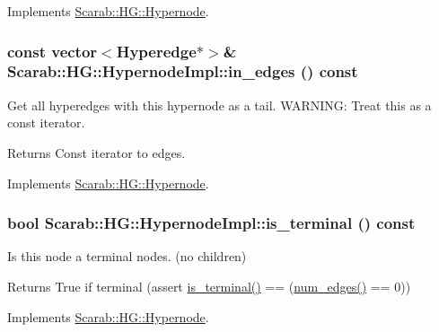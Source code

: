 Implements \hyperlink{classScarab_1_1HG_1_1Hypernode_a533d3e0bc2269ec07edbda32305daf70}{Scarab::HG::Hypernode}.

\hypertarget{classScarab_1_1HG_1_1HypernodeImpl_a77fe0de2e3927be6145cb8fc018088c9}{
\subsubsection[{in\_\-edges}]{\setlength{\rightskip}{0pt plus 5cm}const vector$<${\bf Hyperedge}$\ast$$>$\& Scarab::HG::HypernodeImpl::in\_\-edges () const}}
\label{classScarab_1_1HG_1_1HypernodeImpl_a77fe0de2e3927be6145cb8fc018088c9}
Get all hyperedges with this hypernode as a tail. WARNING: Treat this as a const iterator. \begin{DoxyReturn}{Returns}
Const iterator to edges. 
\end{DoxyReturn}


Implements \hyperlink{classScarab_1_1HG_1_1Hypernode_aad118748408663b8242dc52d45bbd49d}{Scarab::HG::Hypernode}.

\hypertarget{classScarab_1_1HG_1_1HypernodeImpl_a2bb4b33ff207c3c1babe135b9af6323e}{
\subsubsection[{is\_\-terminal}]{\setlength{\rightskip}{0pt plus 5cm}bool Scarab::HG::HypernodeImpl::is\_\-terminal () const}}
\label{classScarab_1_1HG_1_1HypernodeImpl_a2bb4b33ff207c3c1babe135b9af6323e}
Is this node a terminal nodes. (no children)

\begin{DoxyReturn}{Returns}
True if terminal (assert \hyperlink{classScarab_1_1HG_1_1HypernodeImpl_a2bb4b33ff207c3c1babe135b9af6323e}{is\_\-terminal()} == (\hyperlink{classScarab_1_1HG_1_1HypernodeImpl_a7fed4809706319cc916ed4c04a641436}{num\_\-edges()} == 0)) 
\end{DoxyReturn}


Implements \hyperlink{classScarab_1_1HG_1_1Hypernode_ae3e1107309a8817d1015bd70a90c1c49}{Scarab::HG::Hypernode}.

